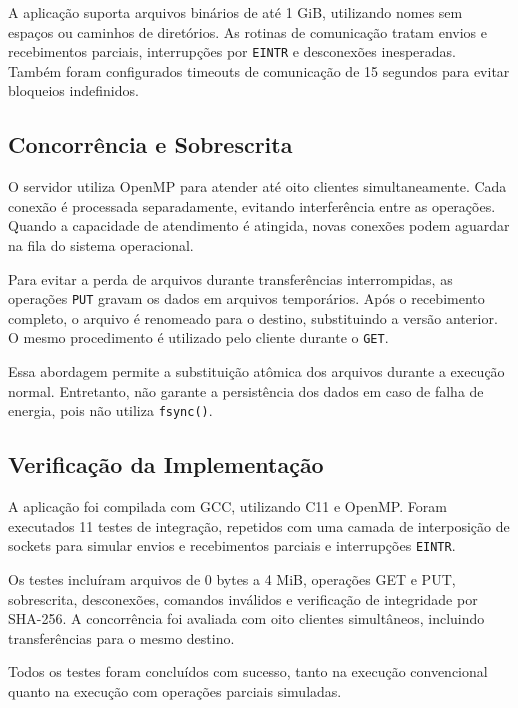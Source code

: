 \documentclass[12pt]{article}
\begin{document}
A aplicação suporta arquivos binários de até 1 GiB, utilizando nomes sem espaços ou caminhos de diretórios. As rotinas de comunicação tratam envios e recebimentos parciais, interrupções por \texttt{EINTR} e desconexões inesperadas. Também foram configurados timeouts de comunicação de 15 segundos para evitar bloqueios indefinidos.

\subsection{Concorrência e Sobrescrita}

O servidor utiliza OpenMP \cite{openmp} para atender até oito clientes simultaneamente. Cada conexão é processada separadamente, evitando interferência entre as operações. Quando a capacidade de atendimento é atingida, novas conexões podem aguardar na fila do sistema operacional.

Para evitar a perda de arquivos durante transferências interrompidas, as operações \texttt{PUT} gravam os dados em arquivos temporários. Após o recebimento completo, o arquivo é renomeado para o destino, substituindo a versão anterior. O mesmo procedimento é utilizado pelo cliente durante o \texttt{GET}.

Essa abordagem permite a substituição atômica dos arquivos durante a execução normal. Entretanto, não garante a persistência dos dados em caso de falha de energia, pois não utiliza \texttt{fsync()}.

\subsection{Verificação da Implementação}

A aplicação foi compilada com GCC, utilizando C11 e OpenMP. Foram executados 11 testes de integração, repetidos com uma camada de interposição de sockets para simular envios e recebimentos parciais e interrupções \texttt{EINTR}.

Os testes incluíram arquivos de 0 bytes a 4 MiB, operações GET e PUT, sobrescrita, desconexões, comandos inválidos e verificação de integridade por SHA-256. A concorrência foi avaliada com oito clientes simultâneos, incluindo transferências para o mesmo destino.

Todos os testes foram concluídos com sucesso, tanto na execução convencional quanto na execução com operações parciais simuladas.

\end{document}
